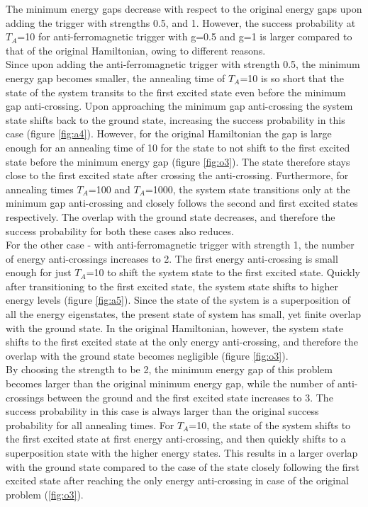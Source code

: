 \documentclass[12]{article}
\begin{document}
The minimum energy gaps decrease with respect to the original energy gaps upon adding the trigger with strengths 0.5, and 1. However, the success probability at $T_A$=10 for anti-ferromagnetic trigger with g=0.5 and g=1 is larger compared to that of the original Hamiltonian, owing to different reasons.\\

Since upon adding the anti-ferromagnetic trigger with strength 0.5, the minimum energy gap becomes smaller, the annealing time of $T_A$=10 is so short that the state of the system transits to the first excited state even before the minimum gap anti-crossing. Upon approaching the minimum gap anti-crossing the system state shifts back to the ground state, increasing the success probability in this case (figure \ref{fig:a4}). However, for the original Hamiltonian the gap is large enough for an annealing time of 10 for the state to not shift to the first excited state before the minimum energy gap (figure \ref{fig:o3}). The state therefore stays close to the first excited state after crossing the anti-crossing.
Furthermore, for annealing times $T_A$=100 and $T_A$=1000, the system state transitions only at the minimum gap anti-crossing and closely follows the second and first excited states respectively. The overlap with the ground state decreases, and therefore the success probability for both these cases also reduces.\\

For the other case - with anti-ferromagnetic trigger with strength 1, the number of energy anti-crossings increases to 2. The first energy anti-crossing is small enough for just $T_A$=10 to shift the system state to the first excited state. Quickly after transitioning to the first excited state, the system state shifts to higher energy levels (figure \ref{fig:a5}). Since the state of the system is a superposition of all the energy eigenstates, the present state of system has small, yet finite overlap with the ground state. In the original Hamiltonian, however, the system state shifts to the first excited state at the only energy anti-crossing, and therefore the overlap with the ground state becomes negligible (figure \ref{fig:o3}).\\

By choosing the strength to be 2, the minimum energy gap of this problem becomes larger than the original minimum energy gap, while the number of anti-crossings between the ground and the first excited state increases to 3. The success probability in this case is always larger than the original success probability for all annealing times. For $T_A$=10, the state of the system shifts to the first excited state at first energy anti-crossing, and then quickly shifts to a superposition state with the higher energy states. This results in a larger overlap with the ground state compared to the case of the state closely following the first excited state after reaching the only energy anti-crossing in case of the original problem (\ref{fig:o3}).
\end{document}
